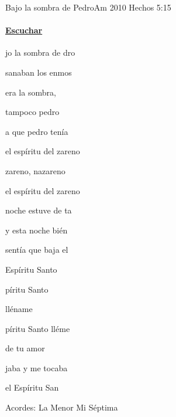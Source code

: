 \documentclass[12pt, spanish]{book}
\begin{document}
    \begin{song}{Bajo la sombra de Pedro}{Am}
    {2010} %
    {}
    {Hechos 5:15} %
    {}
        \ifChordBk
        \paragraph{\mbox{}\hfill\protect\href{https://open.spotify.com/intl-es/track/7mTMuEmJySBs1xTBSLYR26}{Escuchar}\mbox{}\hfill}
        \fi


        \begin{SBOpGroup}
            jo la sombra de dro

            sanaban los enmos

             era la sombra, 

            tampoco pedro

            a que pedro tenía

            el espíritu del zareno
        \end{SBOpGroup}

        \begin{SBChorus}
            zareno, nazareno

            el espíritu del zareno
        \end{SBChorus}

        \begin{SBOpGroup}
            noche estuve de ta

            y esta noche bién

             sentía que baja el

            Espíritu Santo
        \end{SBOpGroup}
        \vskip 20pt
        \begin{SBOpGroup}
            píritu Santo

            lléname

            píritu Santo lléme

            de tu amor

            jaba y me tocaba

            el Espíritu San
        \end{SBOpGroup}

        \ifChordBk
        \begin{SBOpGroup}
            Acordes:\break
            \upchord{\Am}\qquad La Menor \hfill
            \upchord{\Eseven}\qquad Mi S\'eptima \hfill\null\break
        \end{SBOpGroup}
        \fi
    \end{song}
\end{document}

